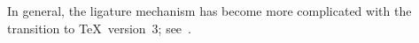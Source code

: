 \documentclass{book}
\begin{document}
In general, the ligature mechanism has become more complicated
with the transition to \TeX\ version~3; see~\cite{K:TeX23}.

\endofchapter
\end{document}
